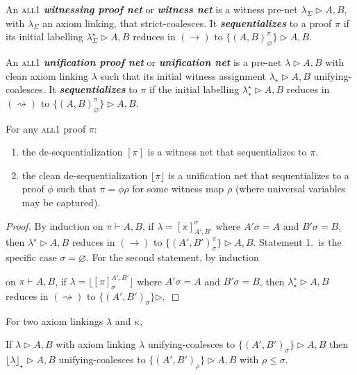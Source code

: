 \documentclass[UKenglish]{lipics-v2016}
\theoremstyle{plain}
\newcommand\defn[1]{\textit{\textbf{#1}}}
\newcommand\floor[1]{\lfloor#1\rfloor}
\newcommand\all{\textsc{all}}
\newcommand\+{+}
\renewcommand\*{\times}
\newcommand\prf[3]{#1\vdash\!#2,#3}
\newcommand\net[3]{#1\triangleright #2,#3}
\newcommand\deseq[4][\sigma]{[#2]_{#1}^{#3,#4}}
\newcommand\gen{\leq}
\newcommand\link[3][\sigma]{(#2,#3)_{#1}}
\newcommand\scoal{\rightarrow} %
\newcommand\ucoal{\rightsquigarrow}
\begin{document}
\begin{definition}
An \all1 \defn{witnessing proof net} or \defn{witness net} is a witness pre-net $\net{\lambda_\Sigma}AB$, with $\lambda_\Sigma$ an axiom linking, that strict-coalesces. It \defn{sequentializes} to a proof $\pi$ if its initial labelling $\net{\lambda_\Sigma^\star}AB$ reduces in $(\scoal)$ to $\net{\{\link[\varnothing]AB^\pi\}}AB$.
\end{definition}


\begin{definition}
An \all1 \defn{unification proof net} or \defn{unification net} is a pre-net $\net\lambda AB$ with clean axiom linking $\lambda$ such that its initial witness assignment $\net{\lambda_\star}AB$ unifying-coalesces. It \defn{sequentializes} to $\pi$ if the initial labelling $\net{\lambda^\star_\star}AB$ reduces in $(\ucoal)$ to $\net{\{\link[\varnothing]AB^\pi\}}AB$.
\end{definition}



\begin{theorem}
For any \all1 proof $\pi$:
\begin{enumerate}
\item the de-sequentialization $[\pi]$ is a witness net that sequentializes to $\pi$. 
\item the clean de-sequentialization $\floor\pi$ is a unification net that sequentializes to a proof $\phi$ such that $\pi=\phi\rho$ for some witness map $\rho$ (where universal variables may be captured).
\end{enumerate}
\end{theorem}

\begin{proof}
By induction on $\prf\pi AB$, if $\lambda=[\pi]_{A',B'}^\sigma$ where $A'\sigma=A$ and $B'\sigma=B$, then $\net{\lambda^\star}AB$ reduces in $(\scoal)$ to $\net{\{\link{A'}{B'}^\pi\}}AB$. Statement 1.\ is the specific case $\sigma=\varnothing$.
%
%
For the second statement, by induction 


 on $\prf\pi AB$, if $\lambda=\floor{\deseq\pi{A'}{B'}}$ where $A'\sigma=A$ and $B'\sigma=B$, then $\net{\lambda^\star_\star}AB$ reduces in $(\ucoal)$ to $\net{\{\link{A'}{B'}\}}{}{}$
\end{proof}

For two axiom linkings $\lambda$ and $\kappa$, 

\begin{lemma}
If $\net\lambda AB$ with axiom linking $\lambda$ unifying-coalesces to $\net{\{\link{A'}{B'}\}}AB$ then $\net{\floor\lambda_\star}AB$ unifying-coalesces to $\net{\{\link[\rho]{A'}{B'}\}}AB$ with $\rho\gen\sigma$.
\end{lemma}
\end{document}
